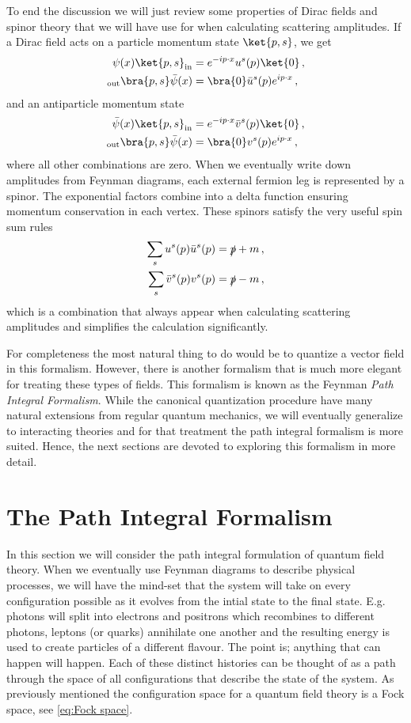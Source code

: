 To end the discussion we will just review some properties of Dirac fields and spinor theory that we will have use for when calculating scattering amplitudes. If a Dirac field acts on a particle momentum state $\ket{p,s}$, we get
\begin{align}\label{eq:spinor relation 1}
    \psi(x)\ket{p,s}_{\text{in}}&=e^{-ip\cdot x}u^{s}(p)\ket{0}\,,
    \\
    _{\text{out}}\bra{p,s}\bar{\psi}(x)&=\bra{0}\bar{u}^{s}(p)e^{ip\cdot x}\,,
\end{align}
and an antiparticle momentum state
\begin{align}\label{eq:spinor relation 2}
    \bar{\psi}(x)\ket{p,s}_{\text{in}}&=e^{-ip\cdot x}\bar{v}^{s}(p)\ket{0}\,,
    \\
    _{\text{out}}\bra{p,s}\bar{\psi}(x)&=\bra{0}v^{s}(p)e^{ip\cdot x}\,,
\end{align}
where all other combinations are zero. When we eventually write down amplitudes from Feynman diagrams, each external fermion leg is represented by a spinor. The exponential factors combine into a delta function ensuring momentum conservation in each vertex. These spinors satisfy the very useful spin sum rules
\begin{align}
    \sum_{s}u^{s}(p)\bar{u}^{s}(p)&=\slashed{p}+m\,,
    \\
    \sum_{s}\bar{v}^{s}(p)v^{s}(p)&=\slashed{p}-m\,,
\end{align}
which is a combination that always appear when calculating scattering amplitudes and simplifies the calculation significantly. 

\medskip
For completeness the most natural thing to do would be to quantize a vector field in this formalism. However, there is another formalism that is much more elegant for treating these types of fields. This formalism is known as the Feynman \emph{Path Integral Formalism}. While the canonical quantization procedure have many natural extensions from regular quantum mechanics, we will eventually generalize to interacting theories and for that treatment the path integral formalism is more suited. Hence, the next sections are devoted to exploring this formalism in more detail.  


\section{The Path Integral Formalism}\label{sec:Path Integral Formalism}
In this section we will consider the path integral formulation of quantum field theory. When we eventually use Feynman diagrams to describe physical processes, we will have the mind-set that the system will take on every configuration possible as it evolves from the intial state to the final state. E.g. photons will split into electrons and positrons which recombines to different photons, leptons (or quarks) annihilate one another and the resulting energy is used to create particles of a different flavour. The point is; anything that can happen will happen. Each of these distinct histories can be thought of as a path through the space of all configurations that describe the state of the system. As previously mentioned the configuration space for a quantum field theory is a Fock space, see \cref{eq:Fock space}. 

